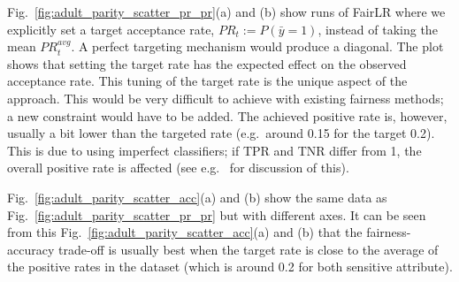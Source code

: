 Fig.~\ref{fig:adult_parity_scatter_pr_pr}(a) and (b) show runs of FairLR
where we explicitly set a target acceptance rate, $\mathit{PR}_t := P(\bar{y}=1)$,
instead of taking the mean $\mathit{PR}_t^{avg}$.
A perfect targeting mechanism would produce a diagonal.
The plot shows that setting the target rate has the expected effect on the observed acceptance rate.
This tuning of the target rate is the unique aspect of the approach.
This would be very difficult to achieve with existing fairness methods;
a new constraint would have to be added.
The achieved positive rate is, however, usually a bit lower than the targeted rate (e.g.\ around 0.15 for the target 0.2).
This is due to using imperfect classifiers;
if TPR and TNR differ from 1,
the overall positive rate is affected (see e.g.\ \citet{forman2005counting} for discussion of this).

Fig.~\ref{fig:adult_parity_scatter_acc}(a) and (b) show the same data
as Fig.~\ref{fig:adult_parity_scatter_pr_pr} but with different axes.
It can be seen from this Fig.~\ref{fig:adult_parity_scatter_acc}(a) and (b)
that the fairness-accuracy trade-off is usually best
when the target rate is close to the average of the positive rates in the dataset
(which is around 0.2 for both sensitive attribute).

